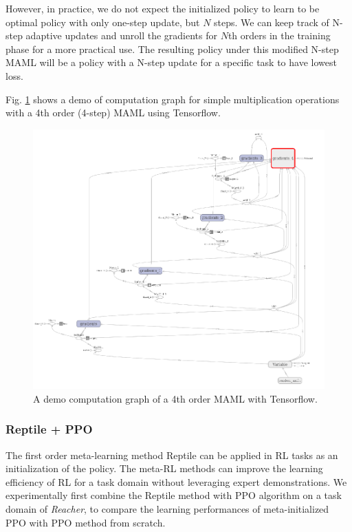 \documentclass{article}
\begin{document}
However, in practice, we do not expect the initialized policy to learn to be optimal policy with only one-step update, but $N$ steps. We can keep track of N-step adaptive updates and unroll the gradients for $N$th orders in the training phase for a more practical use. The resulting policy under this modified N-step MAML will be a policy with a N-step update for a specific task to have lowest loss.

Fig. \ref{fig:potential} shows a demo of computation graph for simple multiplication operations with a 4th order (4-step) MAML using Tensorflow.
\begin{figure}[htbp]
	\centering
	\includegraphics[scale=0.5]{img/potential.png}
	\caption{A demo computation graph of a 4th order MAML with Tensorflow.}
	\label{fig:potential}
\end{figure}

\subsubsection{Reptile + PPO}
The first order meta-learning method Reptile \cite{nichol2018first} can be applied in RL tasks as an initialization of the policy. The meta-RL methods can improve the learning efficiency of RL for a task domain without leveraging expert demonstrations. We experimentally first combine the Reptile method with PPO algorithm on a task domain of \textit{Reacher}, to compare the learning performances of meta-initialized PPO with PPO method from scratch.
\end{document}
